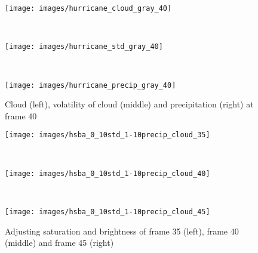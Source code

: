 \begin{figure}
\centering
\begin{minipage}{.33\textwidth}
\texttt{[image: images/hurricane\_cloud\_gray\_40]}
\end{minipage}~
\begin{minipage}{.33\textwidth}
\texttt{[image: images/hurricane\_std\_gray\_40]}
\end{minipage}~
\begin{minipage}{.33\textwidth}
\centering
\texttt{[image: images/hurricane\_precip\_gray\_40]}
\end{minipage}
\caption{Cloud (left), volatility of cloud (middle) and precipitation (right) at frame 40}
\label{fig:hurricane_gray}
\end{figure}

\begin{figure}
\centering
\begin{minipage}{.33\textwidth}
\centering
\texttt{[image: images/hsba\_0\_10std\_1-10precip\_cloud\_35]}
\end{minipage}~
\begin{minipage}{.33\textwidth}
\centering
\texttt{[image: images/hsba\_0\_10std\_1-10precip\_cloud\_40]}
\end{minipage}~
\begin{minipage}{.33\textwidth}
\centering
\texttt{[image: images/hsba\_0\_10std\_1-10precip\_cloud\_45]}
\end{minipage}
\caption{Adjusting saturation and brightness of frame 35 (left), frame 40 (middle) and frame 45 (right)}
\label{fig:hurricane_frames}
\end{figure}

